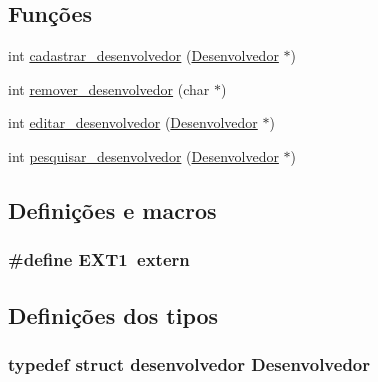 \subsection*{Funções}
\begin{DoxyCompactItemize}
\item 
int \hyperlink{_p-_desenvolvedores_8h_ab39e92aa0e645026c864718a1295d584}{cadastrar\-\_\-desenvolvedor} (\hyperlink{_p-_desenvolvedores_8h_a7a0dacce50a24c9428a7b4ad9d4d7c42}{Desenvolvedor} $\ast$)
\item 
int \hyperlink{_p-_desenvolvedores_8h_a3885dc7d00ab5c2a10c78a1e0148c044}{remover\-\_\-desenvolvedor} (char $\ast$)
\item 
int \hyperlink{_p-_desenvolvedores_8h_a4514778db35abcb4789e26277362885c}{editar\-\_\-desenvolvedor} (\hyperlink{_p-_desenvolvedores_8h_a7a0dacce50a24c9428a7b4ad9d4d7c42}{Desenvolvedor} $\ast$)
\item 
int \hyperlink{_p-_desenvolvedores_8h_a72f24cac3b40fd3296e623599e3b0797}{pesquisar\-\_\-desenvolvedor} (\hyperlink{_p-_desenvolvedores_8h_a7a0dacce50a24c9428a7b4ad9d4d7c42}{Desenvolvedor} $\ast$)
\end{DoxyCompactItemize}


\subsection{Definições e macros}
\hypertarget{_p-_desenvolvedores_8h_a1b19fbdd3be23e1bca939f6a02fb9223}{
\subsubsection[{E\-X\-T1}]{\setlength{\rightskip}{0pt plus 5cm}\#define E\-X\-T1~extern}}\label{_p-_desenvolvedores_8h_a1b19fbdd3be23e1bca939f6a02fb9223}


\subsection{Definições dos tipos}
\hypertarget{_p-_desenvolvedores_8h_a7a0dacce50a24c9428a7b4ad9d4d7c42}{
\subsubsection[{Desenvolvedor}]{\setlength{\rightskip}{0pt plus 5cm}typedef struct {\bf desenvolvedor} {\bf Desenvolvedor}}}\label{_p-_desenvolvedores_8h_a7a0dacce50a24c9428a7b4ad9d4d7c42}


